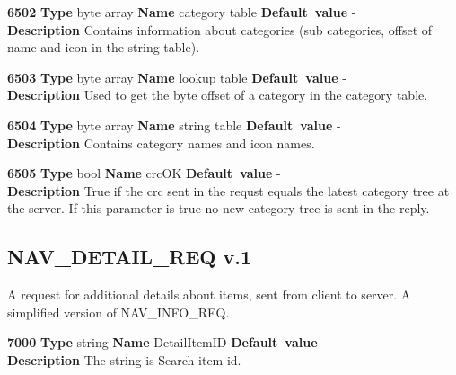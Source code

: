 \documentclass[a4paper]{article}
\begin{document}
\begin{list}{\textbf{ParamID}}{}
\item \textbf{6502} \textbf{Type} byte array \textbf{Name} category table
                 \textbf{Default~value} - \\
  \textbf{Description} Contains information about categories (sub categories, 
offset of name and icon in the string table).

\item \textbf{6503} \textbf{Type} byte array \textbf{Name} lookup table
                 \textbf{Default~value} - \\
  \textbf{Description} Used to get the byte offset of a category in the category 
table.

\item \textbf{6504} \textbf{Type} byte array \textbf{Name} string table
                 \textbf{Default~value} - \\
  \textbf{Description} Contains category names and icon names.

\item \textbf{6505} \textbf{Type} bool \textbf{Name} crcOK
                 \textbf{Default~value} - \\
  \textbf{Description} True if the crc sent in the requst equals the latest
category tree at the server. If this parameter is true no new category tree 
is sent in the reply.

\end{list}





\subsection{NAV\_DETAIL\_REQ v.1}

A request for additional details about items, sent
from client to server. A simplified version of NAV\_INFO\_REQ.

\begin{list}{\textbf{ParamID}}{}
\item \textbf{7000} \textbf{Type} string \textbf{Name} DetailItemID
                 \textbf{Default~value} - \\
  \label{DetailItemID}
  \textbf{Description} The string is Search item id.
\end{list}
\end{document}
